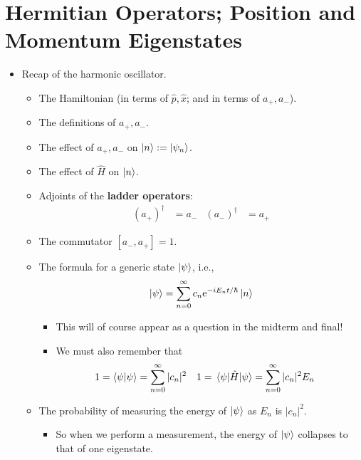 \documentclass[../notes.tex]{subfiles}
\begin{document}
\section{Hermitian Operators; Position and Momentum Eigenstates}
\begin{itemize}
    \item {}Recap of the harmonic oscillator.
    \begin{itemize}
        \item The Hamiltonian (in terms of $\hat{p},\hat{x}$; and in terms of $a_+,a_-$).
        \item The definitions of $a_+,a_-$.
        \item The effect of $a_+,a_-$ on $\ket{n}:=\ket{\psi_n}$.
        \item The effect of $\hat{H}$ on $\ket{n}$.
        \item Adjoints of the \textbf{ladder operators}:
        \begin{align*}
            (a_+)^\dagger &= a_-&
            (a_-)^\dagger &= a_+
        \end{align*}
        \item The commutator $[a_-,a_+]=1$.
        \item The formula for a generic state $\ket{\psi}$, i.e.,
        \begin{equation*}
            \ket{\psi} = \sum_{n=0}^\infty c_n\e[-iE_nt/\hbar]\ket{n}
        \end{equation*}
        \begin{itemize}
            \item This will of course appear as a question in the midterm and final!
            \item We must also remember that
            \begin{align*}
                1 &= \braket{\psi} = \sum_{n=0}^\infty|c_n|^2&
                1 &= \ev{\hat{H}}{\psi} = \sum_{n=0}^\infty|c_n|^2E_n
            \end{align*}
        \end{itemize}
        \item The probability of measuring the energy of $\ket{\psi}$ as $E_n$ is $|c_n|^2$.
        \begin{itemize}
            \item So when we perform a measurement, the energy of $\ket{\psi}$ collapses to that of one eigenstate.
        \end{itemize}
    \end{itemize}

\end{itemize}
\end{document}
